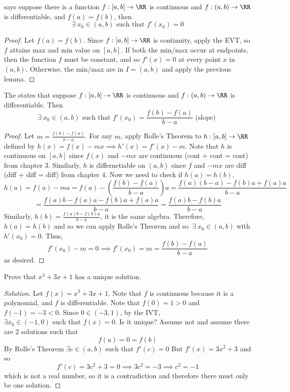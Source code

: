 \documentclass[12pt]{scrartcl}
\begin{document}
\begin{theorem}
   says suppose there is a function $f: [a,b] \to \RR$ is 
  continuous and $f: (a, b) \to \RR$ is differentiable, and $f(a) = f(b)$, then 
  \[\exists \ x_0 \in (a,b) \text{ such that } f'(x_0) = 0\]

  \begin{proof}
    Let $f(a) = f(b)$. Since $f: [a,b] \to \RR$ is continuity, apply the 
    EVT, so $f$ attains max and min value on $[a,b]$. If both the 
    min/max occur at endpoints, then the function $f$ must be constant, and so 
    $f'(x) = 0$ at every point $x$ in $(a,b)$. Otherwise, the 
    min/max are in $I = (a,b)$ and apply the previous lemma. 
  \end{proof}
\end{theorem}

\begin{theorem}
  The  states that suppose $f: [a,b]\to \RR$ is 
  continuous and $f: (a,b)\to\RR$ is differentiable. Then 
  \[\exists \ x_0 \in (a,b) \text{ such that } f'(x_0) = \frac{f(b) - f(a)}{b-a} \text{ (slope) }\]
  \begin{proof}
    Let $m = \frac{f(b) - f(a)}{b - a}$. For any $m$, apply 
    Rolle's Theorem to $h: [a,b]\to\RR$ defined by $h(x) = f(x) -mx \implies h'(x) = f'(x) - m$. 
    Note that $h$ is continuous on $[a,b]$ since $f(x)$ and 
    $-mx$ are continuous (cont + cont = cont) from chapter 3. 
    Similarly, $h$ is differnetiable on $(a,b)$ since 
    $f$ and $-mx$ are diff (diff + diff = diff) from chapter 4. Now we need to check if 
    $h(a) = h(b)$. 
    \[h(a) = f(a) - ma = f(a) - (\frac{f(b) - f(a)}{b-a})a = \frac{f(a)(b-a) - f(b)a + f(a)a}{b-a}\]
    \[= \frac{f(a)b - f(a)a - f(b)a + f(a)a}{b-a} = \frac{f(a)b - f(b)a}{b-a}\]
    Similarly, $h(b) = \frac{f(a)b - f(b)a}{b-a}$, it is the same algebra. 
    Therefore, $h(a) = h(b)$ and so we can apply Rolle's Theorem and 
    so $\ \exists \ x_0 \in (a,b)$ with $h'(x_0) = 0$. Thus, 
    \[f'(x_0) - m = 0 \implies f'(x_0) = m = \frac{f(b) - f(a)}{b-a}\]
    as desired.
  \end{proof}
\end{theorem}

\begin{example}
  Prove that $x^3 + 3x + 1$ has a unique solution.

  \begin{proof}[Solution]
    Let $f(x) = x^3 + 3x + 1$. Note that $f$ is continuous because 
    it is a polynomial, and $f$ is differentiable. Note that 
    $f(0) = 1 > 0$ and $f(-1) = -3 < 0$. Since $0 \in (-3, 1)$, by the IVT, 
    $\exists x_0 \in (-1, 0) \text{ such that } f(x) = 0$. Is it unique?
    Assume not and assume there are $2$ solutions such that 
    \[f(a) = 0 = f(b)\]
    By Rolle's Theorem $\exists c \in (a,b) \text{ such that } f'(c) = 0$
    But $f'(x) = 3x^2 + 3$ and so 
    \[f'(c) = 3c^2 + 3 = 0 \implies 3c^2 = -3 \implies c^2 = -1\]
    which is not a real number, so it is a contradiction and therefore there must 
    only be one solution.
  \end{proof}
\end{example}
\end{document}
